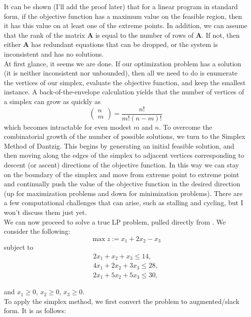 \documentclass[12pt,english]{article}
\begin{document}
It can be shown (I'll add the proof later) that for a linear program in standard form, if the objective function has a maximum value on the feasible region, then it has this value on at least one of the extreme points.   In addition, we can assume that the rank of the matrix $\mathbf{A}$ is equal to the number of rows of $\mathbf{A}$.  If not, then either $\mathbf{A}$ has redundant equations that can be dropped, or the system is inconsistent and has no solutions.\\

At first glance, it seems we are done.  If our optimization problem has a solution (it is neither inconsistent nor unbounded), then all we need to do is enumerate the vertices of our simplex, evaluate the objective function, and keep the smallest instance.  A back-of-the-envelope calculation yields that the number of vertices of a simplex can grow as quickly as
$$
\left(
\begin{array}{c}
n\\
m
\end{array}
\right)
= 
\frac{n!}{m!(n-m)!}
$$
which becomes intractable for even modest $m$ and $n$.  To overcome the combinatorial growth of the number of possible solutions, we turn to the Simplex Method of Dantzig.   This begins by generating an initial feasible solution, and then moving along the edges of the simplex to adjacent vertices corresponding to descent (or ascent) directions of the objective function.  In this way we can stay on the boundary of the simplex and move from extreme point to extreme point and continually push the value of the objective function in the desired direction (up for maximization problems and down for minimization problems).  There are a few computational challenges that can arise, such as stalling and cycling, but I won't discuss them just yet.\\

We can now proceed to solve a true LP problem, pulled directly from \cite{}.  We consider the following:
$$
\max z := x_1 +2 x_2 - x_3
$$
subject to
$$
\begin{array}{c}
2 x_1 + x_2 + x_3 \leq 14, \\
4 x_1 + 2 x_2 + 3 x_3 \leq 28, \\
2 x_1 + 5 x_2 + 5 x_3 \leq 30,
\end{array}
$$

and $x_1 \geq 0$, $x_2 \geq 0$, $x_3 \geq 0$. \\

To apply the simplex method, we first convert the problem to augmented/slack form.  It is as follows:
\end{document}
